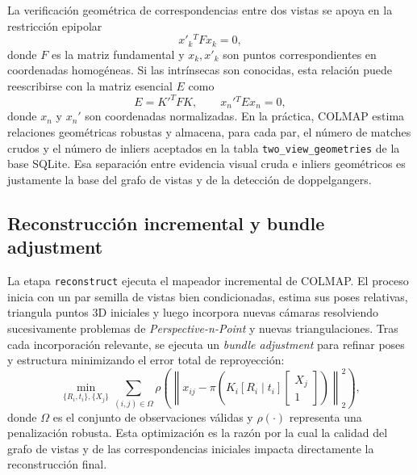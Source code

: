 \documentclass[conference]{IEEEtran}
\begin{document}
La verificaci\'on geom\'etrica de correspondencias entre dos vistas se apoya en la restricci\'on epipolar
\begin{equation}
x'_k{}^{T} F x_k = 0,
\end{equation}
donde \(F\) es la matriz fundamental y \(x_k, x'_k\) son puntos correspondientes en coordenadas homog\'eneas. Si las intr\'insecas son conocidas, esta relaci\'on puede reescribirse con la matriz esencial \(E\) como
\begin{equation}
E = K'^{T} F K,\qquad x_n'{}^{T} E x_n = 0,
\end{equation}
donde \(x_n\) y \(x_n'\) son coordenadas normalizadas. En la pr\'actica, COLMAP estima relaciones geom\'etricas robustas y almacena, para cada par, el n\'umero de matches crudos y el n\'umero de inliers aceptados en la tabla \texttt{two\_view\_geometries} de la base SQLite. Esa separaci\'on entre evidencia visual cruda e inliers geom\'etricos es justamente la base del grafo de vistas y de la detecci\'on de doppelgangers.

\subsection{Reconstrucci\'on incremental y bundle adjustment}

La etapa \texttt{reconstruct} ejecuta el mapeador incremental de COLMAP. El proceso inicia con un par semilla de vistas bien condicionadas, estima sus poses relativas, triangula puntos 3D iniciales y luego incorpora nuevas c\'amaras resolviendo sucesivamente problemas de \emph{Perspective-n-Point} y nuevas triangulaciones. Tras cada incorporaci\'on relevante, se ejecuta un \emph{bundle adjustment} para refinar poses y estructura minimizando el error total de reproyecci\'on:
\begin{equation}
\min_{\{R_i,t_i\}, \{X_j\}}
\sum_{(i,j)\in\Omega}
\rho\!\left(
\left\|
x_{ij} -
\pi\!\left(
K_i [R_i \mid t_i]
\begin{bmatrix}
X_j \\ 1
\end{bmatrix}
\right)
\right\|_2^2
\right),
\end{equation}
donde \(\Omega\) es el conjunto de observaciones v\'alidas y \(\rho(\cdot)\) representa una penalizaci\'on robusta. Esta optimizaci\'on es la raz\'on por la cual la calidad del grafo de vistas y de las correspondencias iniciales impacta directamente la reconstrucci\'on final.
\end{document}
